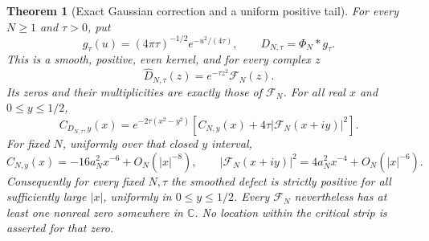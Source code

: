 \documentclass[11pt]{article}
\newtheorem{theorem}{Theorem}
\theoremstyle{remark}\newtheorem{remark}[theorem]{Remark}
\newcommand{\C}{\mathbb C}
\begin{document}
\begin{theorem}[Exact Gaussian correction and a uniform positive tail]
\label{thm:gaussian-head}
For every $N\ge1$ and $\tau>0$, put
\[
 g_\tau(u)=(4\pi\tau)^{-1/2}e^{-u^2/(4\tau)},\qquad
 D_{N,\tau}=\Phi_N*g_\tau.
\]
This is a smooth, positive, even kernel, and for every complex $z$
\[
 \widehat D_{N,\tau}(z)=e^{-\tau z^2}\mathcal F_N(z).       \tag{GS}
\]
Its zeros and their multiplicities are exactly those of $\mathcal F_N$.
For all real $x$ and $0\le y\le1/2$,
\[
 C_{D_{N,\tau},y}(x)=e^{-2\tau(x^2-y^2)}
       \left[C_{N,y}(x)+4\tau|\mathcal F_N(x+iy)|^2\right]. \tag{GD}
\]
For fixed $N$, uniformly over that closed $y$ interval,
\[
 C_{N,y}(x)=-16a_N^2x^{-6}+O_N(|x|^{-8}),\qquad
 |\mathcal F_N(x+iy)|^2=4a_N^2x^{-4}+O_N(|x|^{-6}).       \tag{UT}
\]
Consequently for every fixed $N,\tau$ the smoothed defect is
strictly positive for all sufficiently large $|x|$, uniformly
in $0\le y\le1/2$. Every $\mathcal F_N$ nevertheless has
at least one nonreal zero somewhere in $\C$.
No location within the critical strip is asserted for that zero.
\end{theorem}
\end{document}
